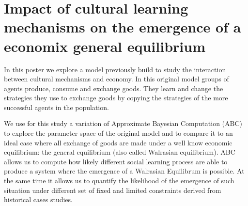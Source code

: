 \documentclass[a4paper,10pt]{report}
\begin{document}
\section*{Impact of cultural learning mechanisms on the emergence of a economix general equilibrium}

In this poster we explore a model previously build to study the interaction between cultural mechanisms and economy. In this original model groups of agents produce, consume and exchange goods. They learn and change the strategies they use to exchange goods by copying the strategies of the more successful agents in the population.

We use for this study a variation of Approximate Bayesian Computation (ABC) to explore the parameter space of the original model and to compare it to an ideal case where all exchange of goods are made under a well  know economic equilibrium: the  general equilibrium (also called Walrasian equilibrium). ABC allows us to compute how likely different social learning process are able to produce a system where the emergence of a Walrasian Equilibrum is possible. At the same time it allows us to quantify the likelihood of the emergence of such situation under different set of fixed and limited constraints derived from historical cases studies.
\end{document}
